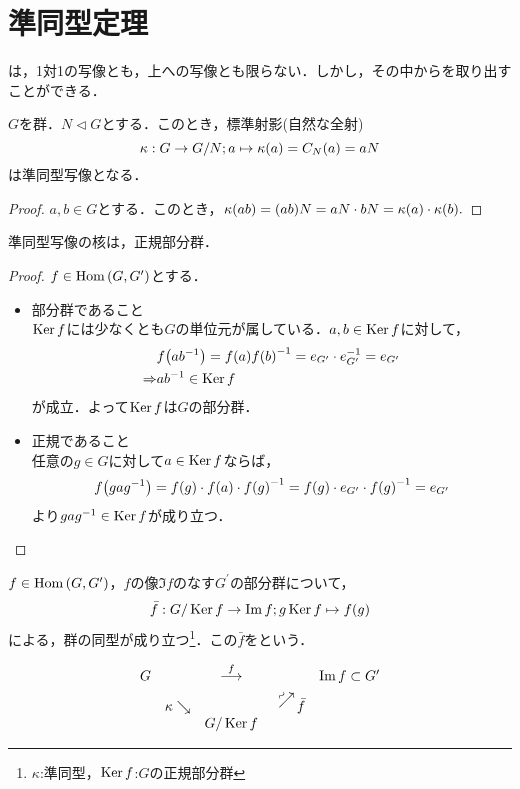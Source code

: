 \documentclass[main]{subfiles}
\begin{document}
\section{準同型定理}
	は，1対1の写像とも，上への写像とも限らない．しかし，その中からを取り出すことができる．
	\begin{prop}
		$G$を群．$N\triangleleft G$とする．このとき，標準射影(自然な全射)
		\[\kappa:G\to G/N;a\mapsto\kappa\qty(a)=C_N\qty(a)=aN\]
		は準同型写像となる．
	\end{prop}
	\begin{proof}
		$a,b\in G$とする．このとき，$\kappa\qty(ab)=\qty(ab)N=aN\cdot bN=\kappa\qty(a)\cdot\kappa\qty(b).$
	\end{proof}
	\begin{prop}
		準同型写像の核は，正規部分群．
	\end{prop}
	\begin{proof}
		$f\in\operatorname{Hom}\qty(G,G^\prime)$とする．
		\begin{itemize}
			\item 部分群であること\\$\operatorname{Ker} f$には少なくとも$G$の単位元が属している．$a,b\in \operatorname{Ker} f$に対して，\begin{align*}
						            & f\qty(ab^{-1})=f\qty(a)f\qty(b)^{-1}=e_{G^\prime}\cdot e_{G^\prime}^{-1}=e_{G^\prime} \\
						\Rightarrow & ab^{-1}\in\operatorname{Ker} f
					\end{align*}
					が成立．よって$\operatorname{Ker} f$は$G$の部分群．
			\item 正規であること\\任意の$g\in G$に対して$a\in\operatorname{Ker} f$ならば，
				\[f\qty(gag^{-1})=f\qty(g)\cdot f\qty(a)\cdot f\qty(g)^{-1}=f\qty(g)\cdot e_{G^\prime}\cdot f\qty(g)^{-1}=e_{G^\prime}\]
				より$gag^{-1}\in\operatorname{Ker} f$が成り立つ．
		\end{itemize}
	\end{proof}
	\begin{thm}[準同型定理]
		$f\in\operatorname{Hom}\qty(G,G^\prime)$，$f$の像$\Im f$のなす$G^\prime$の部分群について，
		\[\bar{f}:G/\operatorname{Ker} f\to\Im f;g\operatorname{Ker} f\mapsto f\qty(g)\]
		による，群の同型が成り立つ\footnote{$\kappa$:準同型，$\operatorname{Ker} f$:$G$の正規部分群}．この$\bar{f}$をという．
	\end{thm}
	\begin{align*}
		\begin{array}{ccccc}
			G &                & \stackrel{f}{\longrightarrow} &                                                           & \Im f\subset G^\prime \\
			  & \kappa\searrow &                               & \rotatebox{45}{$\stackrel{\sim}{\longrightarrow}$}\bar{f} &                       \\
			  &                & G/\Ker f                      &                                                           &
		\end{array}
	\end{align*}
\end{document}
